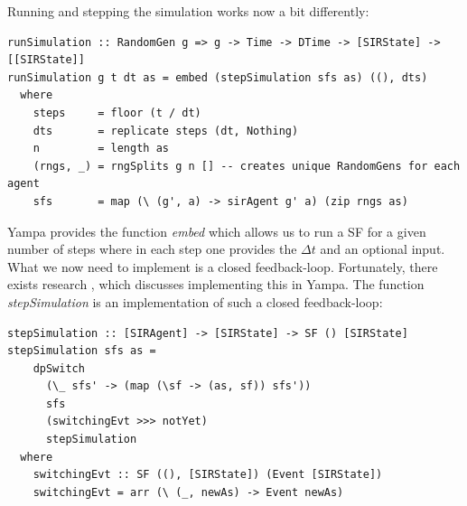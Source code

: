 Running and stepping the simulation works now a bit differently:

\begin{verbatim}
runSimulation :: RandomGen g => g -> Time -> DTime -> [SIRState] -> [[SIRState]]
runSimulation g t dt as = embed (stepSimulation sfs as) ((), dts)
  where
    steps     = floor (t / dt)
    dts       = replicate steps (dt, Nothing)
    n         = length as
    (rngs, _) = rngSplits g n [] -- creates unique RandomGens for each agent
    sfs       = map (\ (g', a) -> sirAgent g' a) (zip rngs as)
\end{verbatim}

Yampa provides the function \textit{embed} which allows us to run a SF for a given number of steps where in each step one provides the $\Delta t$ and an optional input. What we now need to implement is a closed feedback-loop. Fortunately, there exists research \cite{nilsson_functional_2002}, \cite{courtney_yampa_2003} which discusses implementing this in Yampa. The function \textit{stepSimulation} is an implementation of such a closed feedback-loop:

\begin{verbatim}
stepSimulation :: [SIRAgent] -> [SIRState] -> SF () [SIRState]
stepSimulation sfs as =
    dpSwitch
      (\_ sfs' -> (map (\sf -> (as, sf)) sfs'))
      sfs
      (switchingEvt >>> notYet) 
      stepSimulation
  where
    switchingEvt :: SF ((), [SIRState]) (Event [SIRState])
    switchingEvt = arr (\ (_, newAs) -> Event newAs)
\end{verbatim}

